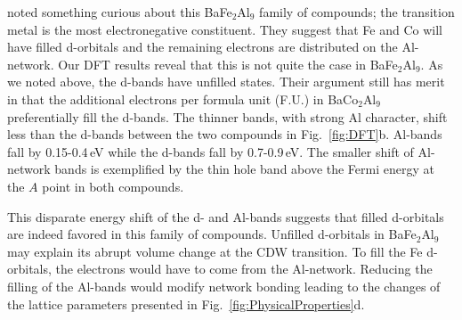 \documentclass[journal=cmatex,manuscript=article]{achemso}
\begin{document}
\citeauthor{Vajenine1998_MagicElectronCountsAeM2Al9} noted something curious about this BaFe$_2$Al$_9$ family of compounds; the transition metal is the most electronegative constituent\cite{Vajenine1998_MagicElectronCountsAeM2Al9}. They suggest that Fe and Co will have filled d-orbitals and the remaining electrons are distributed on the Al-network. 
Our DFT results reveal that this is not quite the case in BaFe$_2$Al$_9$. As we noted above, the d-bands have unfilled states. Their argument still has merit in that the additional electrons per formula unit (F.U.) in BaCo$_2$Al$_9$ preferentially fill the d-bands. The thinner bands, with strong Al character, shift less than the d-bands between the two compounds in Fig.~\ref{fig:DFT}b. Al-bands fall by 0.15-0.4\,eV while the d-bands fall by 0.7-0.9\,eV. The smaller shift of Al-network bands is exemplified by the thin hole band above the Fermi energy at the $A$ point in both compounds. 

This disparate energy shift of the d- and Al-bands suggests that filled d-orbitals are indeed favored in this family of compounds. Unfilled d-orbitals in BaFe$_2$Al$_9$ may explain its abrupt volume change at the CDW transition. To fill the Fe d-orbitals, the electrons would have to come from the Al-network. Reducing the filling of the Al-bands would modify network bonding leading to the changes of the lattice parameters presented in Fig.~\ref{fig:PhysicalProperties}d.



\end{document}
